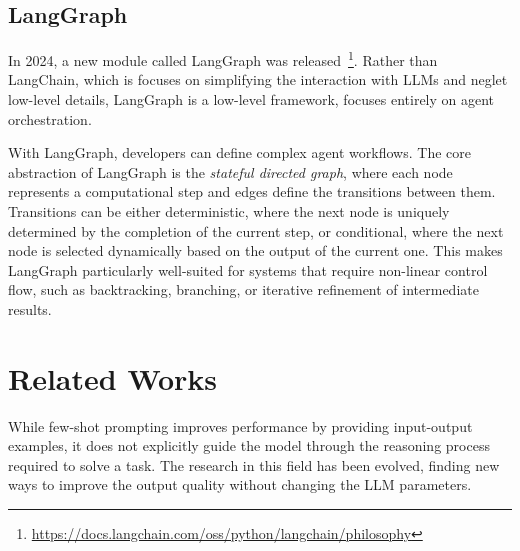 \documentclass[12pt,a4paper,openright,twoside]{book}
\begin{document}
\subsection{LangGraph}
In 2024, a new module called LangGraph was released~\footnote{\url{https://docs.langchain.com/oss/python/langchain/philosophy}}.
Rather than LangChain, which is focuses on simplifying the interaction with \acp{LLM} and neglet low-level details, LangGraph is a low-level framework, focuses entirely on agent orchestration.

With LangGraph, developers can define complex agent workflows. 
The core abstraction of LangGraph is the \textit{stateful directed graph}, where 
each node represents a computational step and edges define the transitions between 
them. 
Transitions can be either deterministic, where the next node is uniquely determined 
by the completion of the current step, or conditional, where the next node is 
selected dynamically based on the output of the current one. 
This makes LangGraph particularly well-suited for systems that require non-linear 
control flow, such as backtracking, branching, or iterative refinement of 
intermediate results. 

\section{Related Works}
%
While few-shot prompting improves performance by providing input-output 
examples, it does not explicitly guide the model through the reasoning 
process required to solve a task.
The research in this field has been evolved, finding new ways to improve the output quality without changing the \ac{LLM} parameters.
\end{document}
